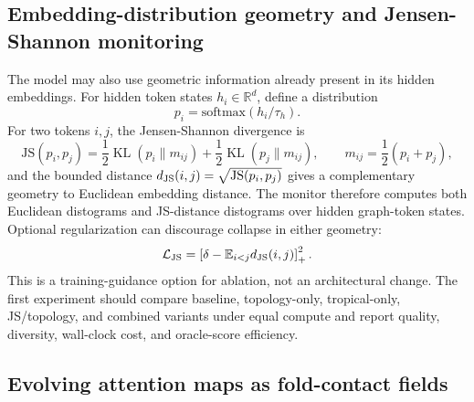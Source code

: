 \documentclass[11pt]{article}
\newcommand{\E}{\mathbb{E}}
\newcommand{\KL}{\operatorname{KL}}
\newcommand{\1}{\mathbf{1}}
\begin{document}
\subsection{Embedding-distribution geometry and Jensen-Shannon monitoring}

The model may also use geometric information already present in its hidden embeddings. For hidden token states \(h_i\in\mathbb R^d\), define a distribution
\[
  p_i=\mathrm{softmax}(h_i/\tau_h).
\]
For two tokens \(i,j\), the Jensen-Shannon divergence is
\[
  \mathrm{JS}(p_i,p_j)=\frac12\KL(p_i\|m_{ij})+\frac12\KL(p_j\|m_{ij}),
  \qquad m_{ij}=\frac12(p_i+p_j),
\]
and the bounded distance \(d_{\rm JS}(i,j)=\sqrt{\mathrm{JS}(p_i,p_j)}\) gives a complementary geometry to Euclidean embedding distance. The monitor therefore computes both Euclidean distograms and JS-distance distograms over hidden graph-token states. Optional regularization can discourage collapse in either geometry:
\[
  \mathcal L_{\rm JS}=\left[\delta-\E_{i<j}d_{\rm JS}(i,j)\right]_+^2.
\]
This is a training-guidance option for ablation, not an architectural change. The first experiment should compare baseline, topology-only, tropical-only, JS/topology, and combined variants under equal compute and report quality, diversity, wall-clock cost, and oracle-score efficiency.

\subsection{Evolving attention maps as fold-contact fields}
\end{document}
